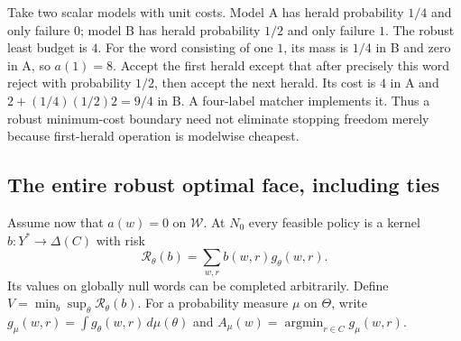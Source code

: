 \begin{example}\label{ex:r67-nonrigid}
Take two scalar models with unit costs. Model A has herald probability $1/4$ and only failure $0$; model B has herald probability $1/2$ and only failure $1$. The robust least budget is $4$. For the word consisting of one $1$, its mass is $1/4$ in B and zero in A, so $a(1)=8$. Accept the first herald except that after precisely this word reject with probability $1/2$, then accept the next herald. Its cost is $4$ in A and $2+(1/4)(1/2)2=9/4$ in B. A four-label matcher implements it. Thus a robust minimum-cost boundary need not eliminate stopping freedom merely because first-herald operation is modelwise cheapest.
\end{example}

\subsection{The entire robust optimal face, including ties}
Assume now that $a(w)=0$ on $\mathcal W$. At $N_0$ every feasible policy is a kernel $b:Y^*\to\Delta(C)$ with risk
\[
 \mathcal R_\theta(b)=\sum_{w,r}b(w,r)g_\theta(w,r).
\]
Its values on globally null words can be completed arbitrarily. Define $V=\min_b\sup_\theta\mathcal R_\theta(b)$. For a probability measure $\mu$ on $\Theta$, write $g_\mu(w,r)=\int g_\theta(w,r)\,d\mu(\theta)$ and
$A_\mu(w)=\operatorname*{argmin}_{r\in C}g_\mu(w,r)$.

